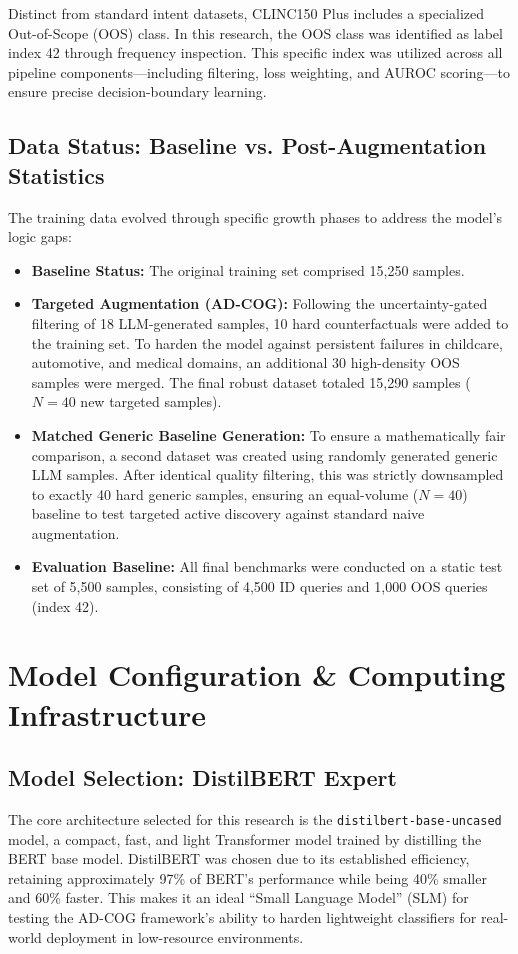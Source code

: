 \documentclass[11pt,a4paper]{article}
\begin{document}
Distinct from standard intent datasets, CLINC150 Plus includes a specialized Out-of-Scope (OOS) class. In this research, the OOS class was identified as label index 42 through frequency inspection. This specific index was utilized across all pipeline components—including filtering, loss weighting, and AUROC scoring—to ensure precise decision-boundary learning.

\subsection{Data Status: Baseline vs. Post-Augmentation Statistics}
The training data evolved through specific growth phases to address the model's logic gaps:
\begin{itemize}
    \item \textbf{Baseline Status:} The original training set comprised 15,250 samples.
    \item \textbf{Targeted Augmentation (AD-COG):} Following the uncertainty-gated filtering of 18 LLM-generated samples, 10 hard counterfactuals were added to the training set. To harden the model against persistent failures in childcare, automotive, and medical domains, an additional 30 high-density OOS samples were merged. The final robust dataset totaled 15,290 samples ($N=40$ new targeted samples).
    \item \textbf{Matched Generic Baseline Generation:} To ensure a mathematically fair comparison, a second dataset was created using randomly generated generic LLM samples. After identical quality filtering, this was strictly downsampled to exactly 40 hard generic samples, ensuring an equal-volume ($N=40$) baseline to test targeted active discovery against standard naive augmentation.
    \item \textbf{Evaluation Baseline:} All final benchmarks were conducted on a static test set of 5,500 samples, consisting of 4,500 ID queries and 1,000 OOS queries (index 42).
\end{itemize}

\section{Model Configuration \& Computing Infrastructure}

\subsection{Model Selection: DistilBERT Expert}
The core architecture selected for this research is the \texttt{distilbert-base-uncased} model, a compact, fast, and light Transformer model trained by distilling the BERT base model. DistilBERT was chosen due to its established efficiency, retaining approximately 97\% of BERT's performance while being 40\% smaller and 60\% faster. This makes it an ideal ``Small Language Model'' (SLM) for testing the AD-COG framework's ability to harden lightweight classifiers for real-world deployment in low-resource environments.
\end{document}
